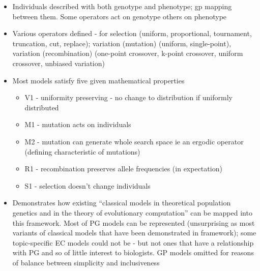 \begin{itemize}
	\item
	
	Individuals described with both genotype and phenotype; gp mapping
	between them. Some operators act on genotype others on phenotype
	
	\item
	
	Various operators defined - for selection (uniform, proportional,
	tournament, truncation, cut, replace); variation (mutation) (uniform,
	single-point), variation (recombination) (one-point crossover, k-point
	crossover, uniform crossover, unbiased variation)
	
	\item
	
	Most models satisfy five given mathematical properties
	
	
	\begin{itemize}
		\item
		
		V1 - uniformity preserving - no change to distribution if uniformly
		distributed
		
		\item
		
		M1 - mutation acts on individuals
		
		\item
		
		M2 - mutation can generate whole search space ie an ergodic operator
		(defining characteristic of mutations)
		
		\item
		
		R1 - recombination preserves allele frequencies (in expectation)
		
		\item
		
		S1 - selection doesn't change individuals
		
	\end{itemize}
	\item
	
	Demonstrates how existing ``classical models in theoretical population
	genetics and in the theory of evolutionary computation'' can be mapped
	into this framework. Most of PG models can be represented
	(unsurprising as most variants of classical models that have been
	demonstrated in framework); some topic-specific EC models could not be
	- but not ones that have a relationship with PG and so of little
	interest to biologists. GP models omitted for reasons of balance
	between simplicity and inclusiveness
	

\end{itemize}
